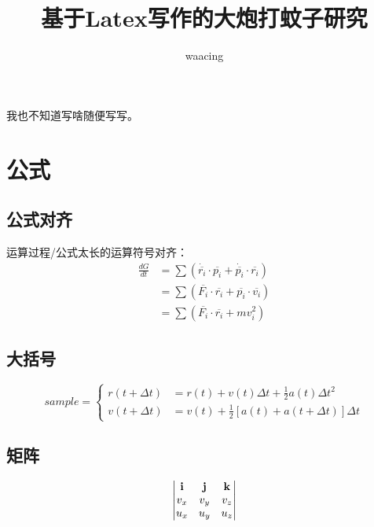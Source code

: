 \documentclass[UTF8,a4paper,10pt,twocolumn]{article}
\title{基于Latex写作的大炮打蚊子研究}
\author{waacing}
\begin{document}
	\maketitle 
	我也不知道写啥随便写写。
	\section{公式}
	\subsection{公式对齐}
	运算过程/公式太长的运算符号对齐：
	\begin{equation} \label{}
		\begin{aligned}
			\frac{dG}{dt}&=\sum(\dot{\overline{r_i}}\cdot \overline{p_i} + \dot{\overline{p_i}} \cdot \overline{r_i} ) \\
			&=\sum(\overline{F_i}\cdot \overline{r_i} + \overline{p_i} \cdot \overline{v_i}) \\
			&=\sum(\overline{F_i}\cdot \overline{r_i} + mv_i^2)
		\end{aligned}
	\end{equation}
	 
	\subsection{大括号}
	\begin{equation}
		sample = \left\{ 
			\begin{aligned}
				r(t+\Delta t)&=r(t)+v(t)\Delta t+\frac{1}{2}a(t)\Delta t^2 \\
				v(t+\Delta t)&=v(t)+\frac{1}{2}[a(t)+a(t+\Delta t)]\Delta t
			\end{aligned}
		\right.
	\end{equation}
	
	\subsection{矩阵}
	
	\begin{equation} \label{Eq.HJ44}
		\begin{gathered}
			\begin{aligned}
				\begin{vmatrix} 
					\vb{i} & \vb{j} & \vb{k} \\ 
					v_x & v_y  & v_z \\ 
					u_x & u_y & u_z
				\end{vmatrix}
			\end{aligned}
		\end{gathered}
	\end{equation}
	
\end{document}
